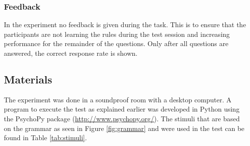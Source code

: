 \subsubsection{Feedback}
\label{sec:feedback}
In the experiment no feedback is given during the task. This is to ensure that the participants are not learning the rules during the test session and increasing performance for the remainder of the questions. Only after all questions are answered, the correct response rate is shown.

\subsection{Materials}
The experiment was done in a soundproof room with a desktop computer.
A program to execute the test as explained earlier was developed in Python using the PsychoPy package (\url{http://www.psychopy.org/}).
The stimuli that are based on the grammar as seen in Figure \ref{fig:grammar} and were used in the test can be found in Table \ref{tab:stimuli}.



